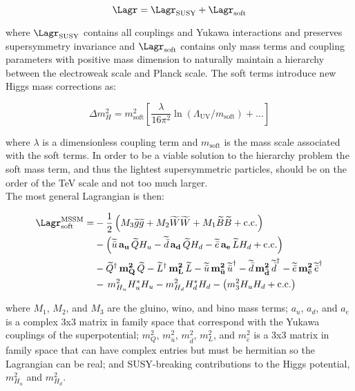 \begin{equation}
	\Lagr = \Lagr_{\mathrm{SUSY}} + \Lagr_{\mathrm{soft}}
\end{equation}

where $\Lagr_{\mathrm{SUSY}}$ contains all couplings and Yukawa interactions and preserves supersymmetry invariance and $\Lagr_{\mathrm{soft}}$ contains only mass terms and coupling parameters with positive mass dimension to naturally maintain a hierarchy between the electroweak scale and Planck scale.  The soft terms introduce new Higgs mass corrections as:


\begin{equation}
	\Delta m_H^2 = m_{\mathrm{soft}}^2 \left[ \frac{\lambda}{16\pi^2}\ln(\Lambda_{\mathrm{UV}}/m_{\mathrm{soft}})+\dots \right]
\end{equation}

where $\lambda$ is a dimensionless coupling term and $m_{\mathrm{soft}}$ is the mass scale associated with the soft terms.  In order to be a viable solution to the hierarchy problem the soft mass term, and thus the lightest supersymmetric particles, should be on the order of the TeV scale and not too much larger.  \\


The most general Lagrangian is then:

\begin{align}
\Lagr_{\rm soft}^{\rm MSSM} =& -\frac{1}{2}\left ( M_3 \widetilde{g} \widetilde{g}
+ M_2 \widetilde{W} \widetilde{W} + M_1 \widetilde{B}\widetilde{B}
+\mathrm{c.c.} \right )
\nonumber
\\
&
-\left ( \widetilde{\bar{u}} \,{\bf a_u}\, \widetilde{Q} H_u
- \widetilde{\bar{d}} \,{\bf a_d}\, \widetilde{Q} H_d
- \widetilde{\bar{e}} \,{\bf a_e}\, \widetilde{L} H_d
+ \mathrm{c.c.} \right ) 
\nonumber
\\
&
-\widetilde{Q}^\dagger \, {\bf m^2_{Q}}\, \widetilde{Q}
-\widetilde{L}^\dagger \,{\bf m^2_{L}}\,\widetilde{L}
-\widetilde{\bar{u}} \,{\bf m^2_{{\bar{u}}}}\, {\widetilde{\bar{u}}}^\dagger
-\widetilde{\bar{d}} \,{\bf m^2_{{\bar{d}}}} \, {\widetilde{\bar{d}}}^\dagger
-\widetilde{\bar{e}} \,{\bf m^2_{{\bar{e}}}}\, {\widetilde{\bar{e}}}^\dagger
\nonumber \\
&
- \, m_{H_u}^2 H_u^* H_u - m_{H_d}^2 H_d^* H_d
- \left ( m_3^2 H_u H_d + \mathrm{c.c.} \right )
\label{MSSMsoft}
\end{align}


where $M_1$, $M_2$, and $M_3$ are the gluino, wino, and bino mass terms; $a_u$, $a_d$, and $a_e$ is a complex 3x3 matrix in family space that correspond with the Yukawa couplings of the superpotential; \textbf{$m^{2}_{Q}$}, \textbf{$m^{2}_{\bar{u}}$}, \textbf{$m^{2}_{\bar{d}}$}, \textbf{$m^{2}_{L}$}, and \textbf{$m^{2}_{\bar{e}}$} is a 3x3 matrix in family space that can have complex entries but must be hermitian so the Lagrangian can be real; and SUSY-breaking contributions to the Higgs potential, $m^{2}_{H_{u}}$ and $m^{2}_{H_{d}}$. \\

